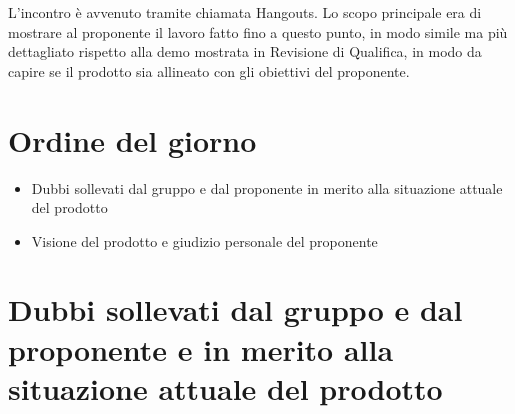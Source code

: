 \documentclass{article}
\begin{document}
L'incontro è avvenuto tramite chiamata Hangouts.
Lo scopo principale era di mostrare al proponente il lavoro fatto fino a questo punto, in modo simile ma più dettagliato rispetto alla demo mostrata in Revisione di Qualifica, in modo da capire se il prodotto sia allineato con gli obiettivi del proponente.

\section{Ordine del giorno}%
\label{sec:ordine_del_giorno}

\begin{itemize}
  \item Dubbi sollevati dal gruppo e dal proponente in merito alla situazione attuale del prodotto
  \item Visione del prodotto e giudizio personale del proponente
\end{itemize}

\section{Dubbi sollevati dal gruppo e dal proponente e in merito alla situazione attuale del prodotto}%
\label{sec:dubbi_sollevati_dal_gruppo_e_dal_proponente_in_merito_alla_situazione_attuale_del_prodotto}
\end{document}
